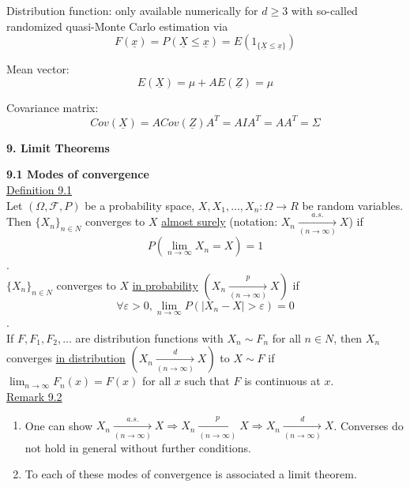 \documentclass[10pt,letterpaper]{article}
\begin{document}
						Distribution function: only available numerically for $d\geq 3$ with so-called randomized quasi-Monte Carlo estimation via $$F(\underline{x})=P(\underline{X}\leq\underline{x})=E(1_{\{\underline{X}\leq\underline{x}\}})$$

						Mean vector:
						$$E(\underline{X})=\mu+AE(\underline{Z})=\mu$$
						
						Covariance matrix:
					  $$Cov(\underline{X})=A Cov(\underline{Z})A^T=AIA^T=AA^T=\Sigma$$

\pagebreak

\begin{center}
\textbf{9. Limit Theorems}
\end{center}

\textbf{9.1 Modes of convergence}\\

\underline{Definition 9.1}\\

				Let $(\Omega, \mathcal{F}, P)$ be a probability space, $X, X_1, \dots, X_n : \Omega\to R$ be random variables. Then $\{X_n\}_{n\in N}$ converges to $X$ \underline{almost surely} (notation: $X_n\underset{(n\to\infty)}{\overset{a.s.}{\to}}X$) if $$P(\lim_{n\to\infty}X_n=X)=1$$.\\
				
				$\{X_n\}_{n\in N}$ converges to $X$ \underline{in probability} $(X_n\underset{(n\to\infty)}{\overset{p}{\to}}X)$ if $$\forall\varepsilon>0, \lim_{n\to\infty}P(|X_n-X|>\varepsilon)=0$$.\\
				
				If $F, F_1, F_2, \dots$ are distribution functions with $X_n\sim F_n$ for all $n\in N$, then $X_n$ converges \underline{in distribution} $(X_n\underset{(n\to\infty)}{\overset{d}{\to}}X)$ to $X\sim F$ if $\lim_{n\to\infty}F_n(x)=F(x)$ for all $x$ such that $F$ is continuous at $x$.\\

\underline{Remark 9.2}\\

\begin{enumerate}
					\item One can show $X_n\underset{(n\to\infty)}{\overset{a.s.}{\to}}X\Rightarrow X_n\underset{(n\to\infty)}{\overset{p}{\to}}X\Rightarrow X_n\underset{(n\to\infty)}{\overset{d}{\to}}X$. Converses do not hold in general without further conditions.
					
					\item To each of these modes of convergence is associated a limit theorem.
\end{enumerate}
\end{document}
